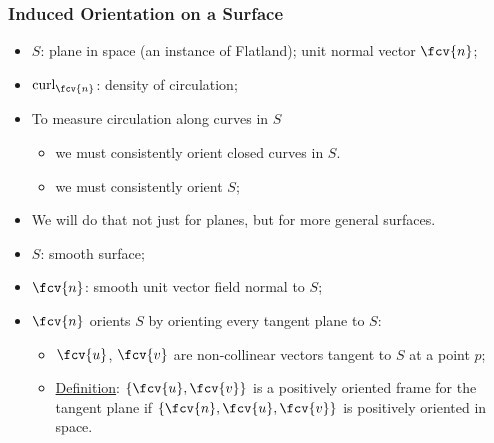\begin{frame}
  \frametitle{Induced Orientation on a Surface}

  \begin{itemize}
    \item $S$: plane in space (an instance of Flatland); unit normal vector $\fcv{n}$;
    \item $\text{curl}_{\fcv{n}}$: density of circulation;
    \item \pause To measure circulation along curves in $S$
    \begin{itemize}
      \item we must consistently orient closed curves in $S$.
      \item we must consistently orient $S$;
    \end{itemize}
    \item \pause We will do that not just for planes, but for more general surfaces.
  \end{itemize}

  \begin{itemize}
    \item $S$: smooth surface;
    \item $\fcv{n}$: smooth unit vector field normal to $S$;
    \item $\fcv{n}$ orients $S$ by orienting every tangent plane to $S$:
    \begin{itemize}
      \item $\fcv{u}$, $\fcv{v}$ are non-collinear vectors tangent to $S$ at a point $p$;
      \item \underline{Definition}: $\{\fcv{u},\fcv{v}\}$ is a positively oriented frame for the tangent plane if $\{\fcv{n},\fcv{u},\fcv{v}\}$ is positively oriented in space.
    \end{itemize}
  \end{itemize}
\end{frame}
